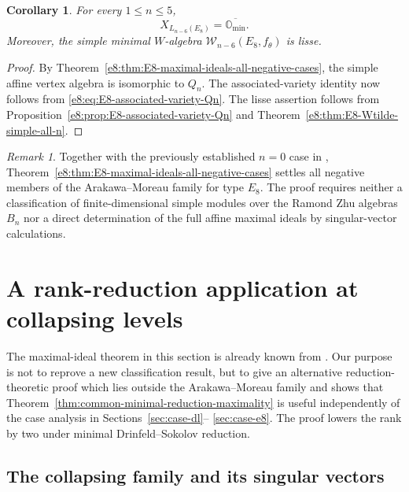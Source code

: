 \documentclass[11pt,reqno]{amsart}
\newtheorem{corollary}[theorem]{Corollary}
\theoremstyle{definition}
\theoremstyle{remark}
\newtheorem{remark}[theorem]{Remark}
\providecommand{\W}{\mathcal{W}}
\begin{document}
\begin{corollary}

For every $1\le n\le5$,
\begin{equation*}
  X_{L_{n-6}(E_8)}
  =\overline{\mathbb O_{\min}}.
\end{equation*}
Moreover, the simple minimal $W$-algebra
$\W_{n-6}(E_8,f_\theta)$ is lisse.
\end{corollary}

\begin{proof}
By Theorem~\ref{e8:thm:E8-maximal-ideals-all-negative-cases}, the simple affine
vertex algebra is isomorphic to $Q_n$.  The associated-variety identity now
follows from \eqref{e8:eq:E8-associated-variety-Qn}.  The lisse assertion follows from
Proposition~\ref{e8:prop:E8-associated-variety-Qn} and
Theorem~\ref{e8:thm:E8-Wtilde-simple-all-n}.
\end{proof}

\begin{remark}

Together with the previously established $n=0$ case in
\cite{ArakawaMoreau2018}, Theorem~\ref{e8:thm:E8-maximal-ideals-all-negative-cases}
settles all negative members of the Arakawa--Moreau family for type $E_8$.
The proof requires neither a classification of finite-dimensional simple
modules over the Ramond Zhu algebras $B_n$ nor a direct determination of the
full affine maximal ideals by singular-vector calculations.
\end{remark}
\section{A rank-reduction application at collapsing levels}
\label{sec:collapsing-application}

The maximal-ideal theorem in this section is already known from
\cite[Section~8]{AdamovicKacMosenederFrajriaPapiPerse2020}.  Our purpose is
not to reprove a new classification result, but to give an alternative
reduction-theoretic proof which lies outside the Arakawa--Moreau family and
shows that Theorem~\ref{thm:common-minimal-reduction-maximality} is useful
independently of the case analysis in Sections~\ref{sec:case-dl}--
\ref{sec:case-e8}.  The proof lowers the rank by two under minimal
Drinfeld--Sokolov reduction.

\subsection{The collapsing family and its singular vectors}
\end{document}
